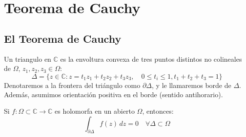 \section{Teorema de Cauchy}
\subsection{El Teorema de Cauchy}

\begin{definición}
    Un triangulo en $\mathbb{C}$ es la envoltura convexa de tres puntos distintos no colineales de $\Omega$, $z_1, z_2, z_3 \in \Omega$:
    \[
        \Delta = \{ z \in \mathbb{C} : 
        z = t_1 z_1 + t_2 z_2 + t_3 z_3, \quad
        0 \leq t_i \leq 1, t_1 + t_2 + t_3 = 1 \}
    \]
    Denotaremos a la frontera del triángulo como $\partial \Delta$, y le llamaremos borde de $\Delta$. Además, asumimos orientación positiva en el borde (sentido antihorario).
\end{definición}

\begin{teorema}
    Si $f: \Omega \subset \mathbb{C} \to \mathbb{C}$ es holomorfa en un abierto $\Omega$, entonces:
    \[
        \int_{\partial \Delta} f(z) \, dz = 0 \quad \forall \Delta \subset \Omega
    \]
\end{teorema}

